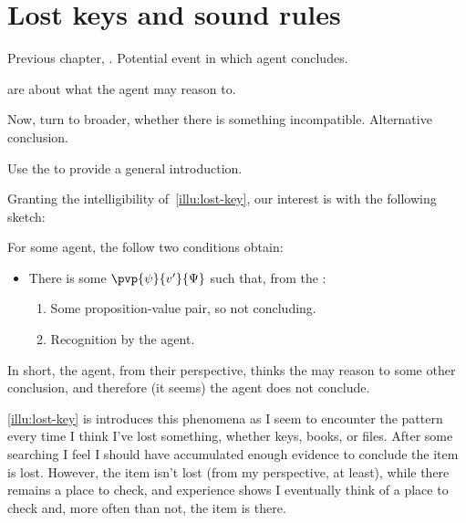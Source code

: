 \chapter{Lost keys and sound rules}
\label{cha:zS:sec:lost-keys}

\begin{note}
  Previous chapter, .
  Potential event in which agent concludes.

   are about what the agent may reason to.

  Now, turn to broader, whether there is something incompatible.
  Alternative conclusion.
\end{note}

\begin{note}
  Use the \illu{} to provide a general introduction.
\end{note}


\begin{note}
  Granting the intelligibility of~\autoref{illu:lost-key}, our interest is with the following sketch:

  \begin{sketch}
    \label{sketch:zS:fail}
    For some agent, the follow two conditions obtain:

    \begin{itemize}
    \item
      There is some \(\pvp{\psi}{v'}{\Psi}\) such that, from the \agpe{}:
      \begin{enumerate}
      \item
        Some proposition-value pair, so not concluding.
      \item
        Recognition by the agent.
      \end{enumerate}
    \end{itemize}
  \vspace{-\baselineskip}
  \end{sketch}

  In short, the agent, from their perspective, thinks the may reason to some other conclusion, and therefore (it seems) the agent does not conclude.

  
\end{note}

\begin{note}
  \autoref{illu:lost-key} is introduces this phenomena as I seem to encounter the pattern every time I think I've lost something, whether keys, books, or files.
  After some searching I feel I should have accumulated enough evidence to conclude the item is lost.
  However, the item isn't lost (from my perspective, at least), while there remains a place to check, and experience shows I eventually think of a place to check and, more often than not, the item is there.
\end{note}

